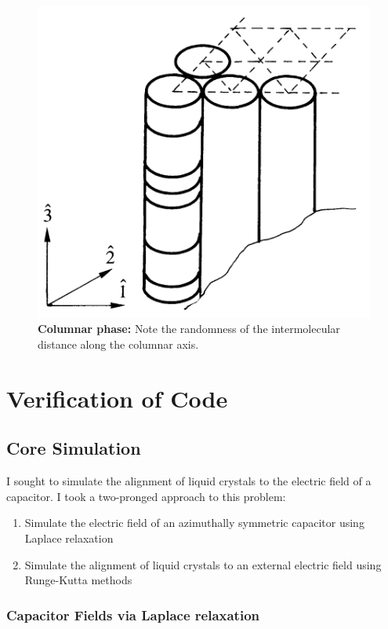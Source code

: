 \documentclass[twocolumn,aps,prl]{revtex4-1} %
\begin{document}
\begin{figure}
    \includegraphics[scale=0.3]{columnar.png}
    \caption{\textbf{Columnar phase:} \cite{gennes_physics_1974} Note the randomness of the intermolecular distance along the columnar axis. }
    \label{fig:columnar}
\end{figure}


\section{Verification of Code}

\subsection{Core Simulation}

I sought to simulate the alignment of liquid crystals to the electric field of a capacitor.  I took a two-pronged approach to this problem: \begin{enumerate}
\item Simulate the electric field of an azimuthally symmetric capacitor using Laplace relaxation
\item Simulate the alignment of liquid crystals to an external electric field using Runge-Kutta methods
\end{enumerate}

\subsubsection{Capacitor Fields via Laplace relaxation}
\end{document}
